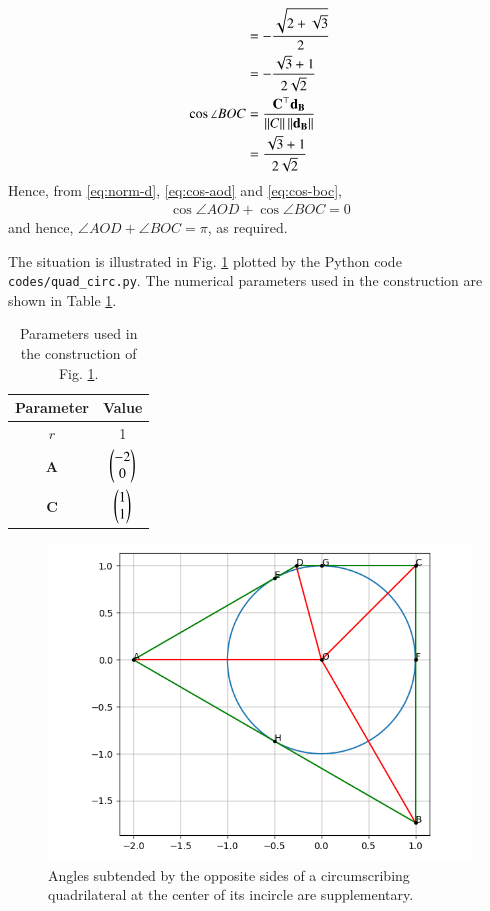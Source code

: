 \documentclass[journal,12pt,twocolumn]{IEEEtran}
\renewcommand{\vec}[1]{\boldsymbol{\mathbf{#1}}}
\begin{document}
\begin{enumerate}
\begin{align}
                       &= -\frac{\sqrt{2+\sqrt{3}}}{2} \\
                       &= -\frac{\sqrt{3}+1}{2\sqrt{2}} \label{eq:cos-aod} \\
        \cos\angle BOC &= \frac{\vec{C}^\top\vec{d_B}}{\norm{C}\norm{\vec{d_B}}} \\
                       &= \frac{\sqrt{3}+1}{2\sqrt{2}} \label{eq:cos-boc}
    \end{align}
    Hence, from \eqref{eq:norm-d}, \eqref{eq:cos-aod} and \eqref{eq:cos-boc},
    \begin{align}
        \cos\angle AOD + \cos\angle BOC = 0
    \end{align}
    and hence, $\angle AOD + \angle BOC = \pi$, as required.

    The situation is illustrated in Fig. \ref{fig:quad-circ} plotted by the 
    Python code \texttt{codes/quad\_circ.py}. The numerical parameters used 
    in the construction are shown in Table \ref{tab:param}.
    \begin{table}[!ht]
        \centering
        \begin{tabular}{|c|c|}
            \hline
            \textbf{Parameter} & \textbf{Value} \\
            \hline
            $r$ & 1 \\
            \hline
            $\vec{A}$ & $\begin{pmatrix}-2\\0\end{pmatrix}$ \\
            \hline
            $\vec{C}$ & $\begin{pmatrix}1\\1\end{pmatrix}$ \\
            \hline
        \end{tabular}
        \caption{Parameters used in the construction of Fig. \ref{fig:quad-circ}.}
        \label{tab:param}
    \end{table}
    \begin{figure}[!ht]
        \centering
        \includegraphics[width=\columnwidth]{figs/quad_circ.png}
        \caption{Angles subtended by the opposite sides of a circumscribing quadrilateral at the center of its incircle are supplementary.}
        \label{fig:quad-circ}
    \end{figure}
\end{enumerate}
\end{document}
